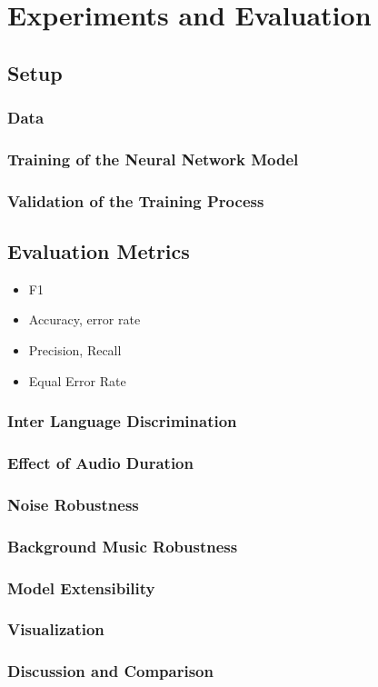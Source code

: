 \section{Experiments and Evaluation} 
\label{sec:evaluation}

\subsection{Setup} 
\label{sec:setup}
\subsubsection{Data} 
\label{sec:data}
\subsubsection{Training of the Neural Network Model} 
\label{sec:training}
\subsubsection{Validation of the Training Process} 
\label{sec:validation}

\subsection{Evaluation Metrics} 
\label{sec:metrics}
\begin{itemize}
    \item F1
    \item Accuracy, error rate
    \item Precision, Recall
    \item Equal Error Rate
\end{itemize}

\subsubsection{Inter Language Discrimination} 
\label{sec:lang_discrimination}
\subsubsection{Effect of Audio Duration} 
\label{sec:duration}
\subsubsection{Noise Robustness} 
\label{sec:noise_robustness}
\subsubsection{Background Music Robustness} 
\label{sec:music_robustness}
\subsubsection{Model Extensibility} 
\label{sec:extensibility}
\subsubsection{Visualization} 
\label{sec:visualization}

\subsubsection{Discussion and Comparison} 
\label{sec:comparison}
